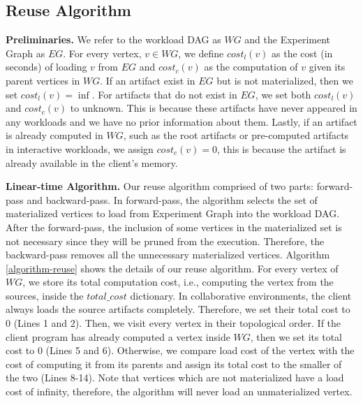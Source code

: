 \subsection{Reuse Algorithm} 
\textbf{Preliminaries.} 
We refer to the workload DAG as $WG$ and the Experiment Graph as $EG$.
For every vertex, $v \in WG$, we define $cost_l(v)$ as the cost (in seconds) of loading $v$ from $EG$  and $cost_c(v)$ as the computation of $v$ given its parent vertices in $WG$.
If an artifact exist in $EG$ but is not materialized, then we set $cost_l(v)=\inf$.
For artifacts that do not exist in $EG$, we set both $cost_l(v)$ and $cost_c(v)$ to unknown.
This is because these artifacts have never appeared in any workloads and we have no prior information about them.
Lastly, if an artifact is already computed in $WG$, such as the root artifacts or pre-computed artifacts in interactive workloads, we assign $cost_c(v)=0$, this is because the artifact is already available in the client's memory.

\textbf{Linear-time Algorithm.}
Our reuse algorithm comprised of two parts: forward-pass and backward-pass.
In forward-pass, the algorithm selects the set of materialized vertices to load from Experiment Graph into the workload DAG.
After the forward-pass, the inclusion of some vertices in the materialized set is not necessary since they will be pruned from the execution.
Therefore, the backward-pass removes all the unnecessary materialized vertices.
Algorithm \ref{algorithm-reuse} shows the details of our reuse algorithm.
For every vertex of $WG$, we store its total computation cost, i.e., computing the vertex from the sources, inside the $total\_cost$ dictionary.
In collaborative environments, the client always loads the source artifacts completely.
Therefore, we set their total cost to 0 (Lines 1 and 2).
Then, we visit every vertex in their topological order.
If the client program has already computed a vertex inside $WG$, then we set its total cost to 0 (Lines 5 and 6).
Otherwise, we compare load cost of the vertex with the cost of computing it from its parents and assign its total cost to the smaller of the two (Lines 8-14).
Note that vertices which are not materialized have a load cost of infinity, therefore, the algorithm will never load an unmaterialized vertex.

